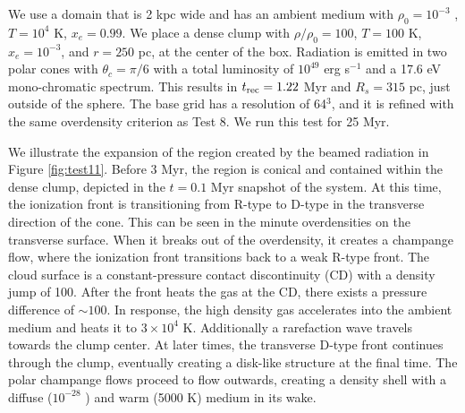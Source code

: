 \documentclass[12pt,preprint]{aastex}
\begin{document}
We use a domain that is 2 kpc wide and has an ambient medium with
$\rho_0 = 10^{-3}$ \cubecm, $T = 10^4$ K, $x_e = 0.99$.  We place a
dense clump with $\rho/\rho_0 = 100$, $T = 100$ K, $x_e = 10^{-3}$,
and $r = 250$ pc, at the center of the box.  Radiation is emitted in
two polar cones with $\theta_c = \pi/6$ with a total luminosity of
$10^{49}$ erg s$^{-1}$ and a 17.6 eV mono-chromatic spectrum.  This
results in $t_{\rm rec} = 1.22$ Myr and $R_s = 315$ pc, just outside
of the sphere.  The base grid has a resolution of 64$^3$, and it is
refined with the same overdensity criterion as Test 8.  We run this
test for 25 Myr.

We illustrate the expansion of the  region created by the
beamed radiation in Figure \ref{fig:test11}.  Before 3 Myr, the
 region is conical and contained within the dense clump,
depicted in the $t = 0.1$ Myr snapshot of the system.  At this time,
the ionization front is transitioning from R-type to D-type in the
transverse direction of the cone.  This can be seen in the minute
overdensities on the  transverse surface.  When it breaks
out of the overdensity, it creates a champange flow, where the
ionization front transitions back to a weak R-type front.  The cloud
surface is a constant-pressure contact discontinuity (CD) with a
density jump of 100.  After the front heats the gas at the CD, there
exists a pressure difference of $\sim 100$.  In response, the high
density gas accelerates into the ambient medium and heats it to $3
\times 10^4$ K.  Additionally a rarefaction wave travels towards the
clump center.  At later times, the transverse D-type front continues
through the clump, eventually creating a disk-like structure at the
final time.  The polar champange flows proceed to flow outwards,
creating a density shell with a diffuse ($10^{-28}$ \cubecm) and warm
(5000 K) medium in its wake.

% 
\end{document}
